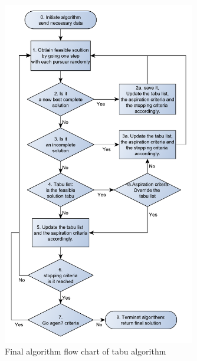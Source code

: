\begin{figure}[!h]
\centering
\includegraphics[width=0.75\textwidth,height=0.70\textheight]{chapter_4_methods/ny_Tabu}
\caption[Final algorithm flow chart of tabu algorithm]
{Final algorithm flow chart of tabu algorithm}
\end{figure}

